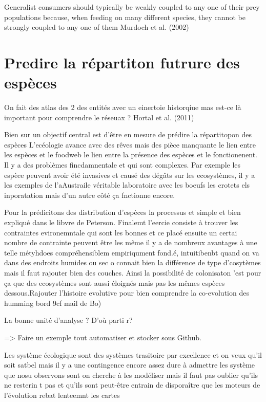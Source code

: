 Generalist consumers should typically be weakly coupled to any one of
their prey populations because, when feeding on many different species,
they cannot be strongly coupled to any one of them Murdoch et al. (2002)

\section{Predire la répartiton futrure des
espèces}\label{predire-la-ruxe9partiton-futrure-des-espuxe8ces}

On fait des atlas des 2 des entités avec un einertoie historqiue mas
est-ce là important pour comprendre le réseuax ? Hortal et al. (2011)

Bien sur un objectif central est d'être en mesure de prédire la
répartitopon des espèces L'ecéologie avance avec des rêves mais des
pièce manquante le lien entre les espèces et le foodweb le lien entre la
présence des espèces et le fonctionenent. Il y a des problèmes
fincdamnentale et qui sont complexes. Par exemple les espèce peuvent
avoir été invasives et causé des dégâts sur les ecosystèmes, il y a les
exemples de l'aAustraile véritable laboratoire avec les boeufs les
crotets els inporatation mais d'un autre côté ça fnctionne encore.

Pour la prédicitons des distribution d'espèces la processus et simple et
bien expliqué dans le libvre de Peterson. Finalemt l'eercie consiste à
trouver les contraintes evironemntale qui sont les bonnes et ce placé
ensuite un certai nombre de contrainte peuvent être les même il y a de
nombreux avantages à une telle métyhdoes compréhensiblem empiriqument
fond.é, intuitibenbt quand on va dans des endroits humides ou sec o
connait bien la différence de type d'cosytèmes mais il faut rajouter
bien des couches. Ainsi la possibilité de colonisaton 'est pour ça que
des ecosystèmes sont aussi éloignés mais pas les mêmes espèces
dessous.Rajouter l'histoire evolutive pour bien comprendre la
co-evolution des humming bord 9cf mail de Bo)

La bonne unité d'analyse ? D'où parti r?

=\textgreater{} Faire un exemple tout automatiser et stocker sous
Github.

Les système écologique sont des systèmes trasitoire par excellence et on
veux qu'il soit satbel mais il y a une contingence encore assez dure à
admettre les système que nosu observons sont on cherche à les modéliser
mais il faut pas oublier qu'ils ne resterin t pas et qu'ils sont
peut-être entrain de disporaître que les moteurs de l'évolution rebat
lenteemnt les cartes

